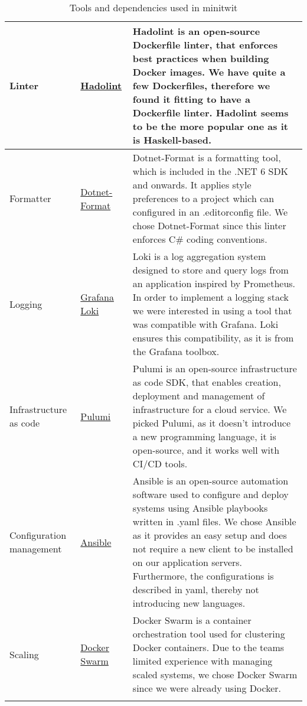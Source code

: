 \begin{longtable}{|p{}|p{} | p{}|}
    \hline
    Linter & \href{https://github.com/hadolint/hadolint}{Hadolint} & Hadolint is an open-source Dockerfile linter, that enforces best practices when building Docker images. We have quite a few Dockerfiles, therefore we found it fitting to have a Dockerfile linter. Hadolint seems to be the more popular one as it is Haskell-based.\\
    \hline
    Formatter & \href{https://learn.microsoft.com/en-us/dotnet/core/tools/dotnet-format}{Dotnet-Format} & Dotnet-Format is a formatting tool, which is included in the .NET 6 SDK and onwards. It applies style preferences to a project which can configured in an .editorconfig file. We chose Dotnet-Format since this linter enforces C\# coding conventions.\\
    \hline
    Logging & \href{https://grafana.com/docs/loki/latest/}{Grafana Loki} & Loki is a log aggregation system designed to store and query logs from an application inspired by Prometheus. In order to implement a logging stack we were interested in using a tool that was compatible with Grafana. Loki ensures this compatibility, as it is from the Grafana toolbox.\\
    \hline
    Infrastructure as code & \href{https://www.pulumi.com/docs/}{Pulumi} & Pulumi is an open-source infrastructure as code SDK, that enables creation, deployment and management of infrastructure for a cloud service. We picked Pulumi, as it doesn't introduce a new programming language, it is open-source, and it works well with CI/CD tools.\\
    \hline
    Configuration management & \href{https://docs.ansible.com/}{Ansible} & Ansible is an open-source automation software used to configure and deploy systems using Ansible playbooks written in .yaml files. We chose Ansible as it provides an easy setup and does not require a new client to be installed on our application servers. Furthermore, the configurations is described in yaml, thereby not introducing new languages.\\
    \hline
    Scaling & \href{https://docs.docker.com/reference/cli/docker/swarm/}{Docker Swarm} & Docker Swarm is a container orchestration tool used for clustering Docker containers. Due to the teams limited experience with managing scaled systems, we chose Docker Swarm since we were already using Docker.\\
    \hline
    \caption{Tools and dependencies used in minitwit}
    \label{tab:tool}
\end{longtable}
